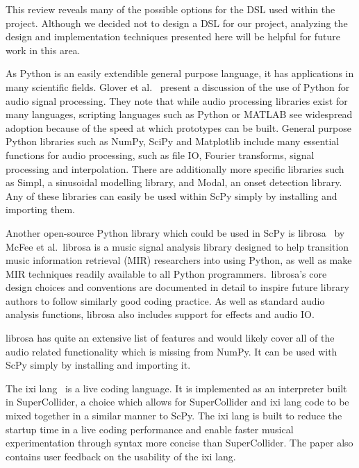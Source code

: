 \documentclass{article}
\begin{document}
This review reveals many of the possible options for the DSL used within the project. Although we
decided not to design a DSL for our project, analyzing the design and implementation techniques
presented here will be helpful for future work in this area.
\\\par
As Python is an easily extendible general purpose language, it has applications in many scientific
fields. Glover et al.~\cite{glover2011python} present a discussion of the use of Python for audio
signal processing. They note that while audio processing libraries exist for many languages,
scripting languages such as Python or MATLAB see widespread adoption because of the speed at which
prototypes can be built. General purpose Python libraries such as NumPy, SciPy and Matplotlib
include many essential functions for audio processing, such as file IO, Fourier transforms, signal
processing and interpolation. There are additionally more specific libraries such as Simpl, a
sinusoidal modelling library, and Modal, an onset detection library. Any of these libraries can
easily be used within ScPy simply by installing and importing them.
\\\par
Another open-source Python library which could be used in ScPy is librosa~\cite{mcfee2015librosa}
by McFee et al.\ librosa is a music signal analysis library designed to help transition music
information retrieval (MIR) researchers into using Python, as well as make MIR techniques readily
available to all Python programmers.\ librosa's core design choices and conventions are documented
in detail to inspire future library authors to follow similarly good coding practice. As well as
standard audio analysis functions, librosa also includes support for effects and audio IO.\@

librosa has quite an extensive list of features and would likely cover all of the audio related
functionality which is missing from NumPy. It can be used with ScPy simply by installing and importing
it.
\\\par
The ixi lang~\cite{magnusson2011ixi} is a live coding language. It is implemented as an interpreter
built in SuperCollider, a choice which allows for SuperCollider and ixi lang code to be mixed
together in a similar manner to ScPy. The ixi lang is built to reduce the startup time in a live
coding performance and enable faster musical experimentation through syntax more concise than
SuperCollider. The paper also contains user feedback on the usability of the ixi lang.
\end{document}
